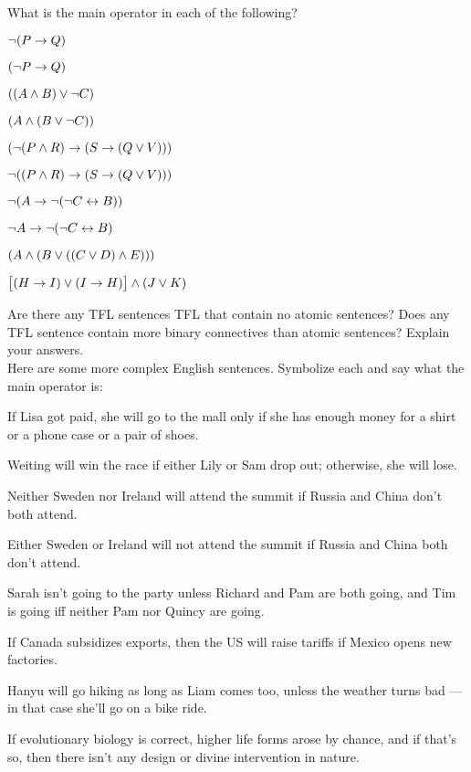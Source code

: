 \problempart
What is the main operator in each of the following?  

\begin{earg}
\item $\neg (P \rightarrow Q)$
\item $(\neg P \rightarrow Q)$
\item $((A \wedge B) \vee \neg C)$
\item $(A \wedge (B \vee \neg C))$
\item $(\neg (P \wedge R) \rightarrow (S \rightarrow (Q \vee V)))$
\item$\neg ((P \wedge R) \rightarrow (S \rightarrow (Q \vee V)))$
\item $\neg(A \rightarrow \neg (\neg C \leftrightarrow B))$
\item $\neg A \rightarrow \neg (\neg C \leftrightarrow B)$
\item $(A \wedge (B \vee ((C \vee D) \wedge E)))$
\item $\bigl[(H \rightarrow I) \vee (I \rightarrow H)\bigr] \wedge (J \vee K)$
\end{earg}

\problempart
Are there any TFL sentences TFL that contain no atomic sentences? Does any TFL sentence contain more binary connectives than atomic sentences?  Explain your answers.\\

\problempart
Here are some more complex English sentences.   Symbolize each and say what the main operator is:


\begin{earg}

\item If Lisa got paid, she will go to the mall only if she has enough money for a shirt or a phone case or a pair of shoes.

\item Weiting will win the race if either Lily or Sam drop out; otherwise, she will lose.



\item Neither Sweden nor Ireland will attend the summit if Russia and China don't both attend.

\item Either Sweden or Ireland will not attend the summit if Russia and China both don't attend.

\item Sarah isn't going to the party unless Richard and Pam are both going, and Tim is
going iff neither Pam nor Quincy are going.

\item If Canada subsidizes exports, then the US will raise tariffs if Mexico opens new factories.


\item Hanyu will go hiking as long as Liam comes too, unless the weather turns bad --- in that case she'll go on a bike ride.

\item   If evolutionary biology is correct, higher life forms arose by  chance, and if that's so, then there isn't any design or divine intervention in nature.


\end{earg}
